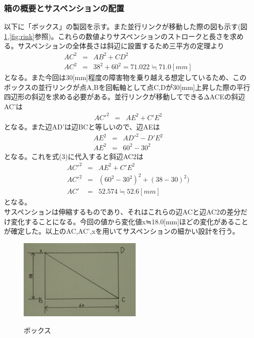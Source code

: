\documentclass[11pt]{jsarticle}
\begin{document}
\subsubsection{箱の概要とサスペンションの配置}
以下に「ボックス」の製図を示す。また並行リンクが移動した際の図も示す(図\ref{fig:bix},\ref{fig:rink}参照)。これらの数値よりサスペンションのストロークと長さを求める。サスペンションの全体長さは斜辺に設置するため三平方の定理より
\begin{eqnarray}
   AC^2 & = & AB^2+CD^2 \\
  AC^2 & = & 38^2+60^2 = 71.022 ≒　71.0 [mm]
\end{eqnarray}
となる。また今回は30[mm]程度の障害物を乗り越える想定しているため、このボックスの並行リンクが点A,Bを回転軸として点C,Dが30[mm]上昇した際の平行四辺形の斜辺を求める必要がある。並行リンクが移動してできるΔACEの斜辺AC'は
\begin{eqnarray}
   AC'^2 & = & AE^2+C'E^2 
\end{eqnarray}
となる。また辺AD'は辺BCと等しいので、辺AEは
\begin{eqnarray}
	AE^2 & = & AD'^2-D'E^2 \\
	AE^2 & = & 60^2-30^2 
\end{eqnarray}
となる。これを式(3)に代入すると斜辺AC2は
\begin{eqnarray}
	AC'^2 & = & AE^2+C'E^2 \\
	AC'^2 & = & (60^2-30^2)^2+(38-30)^2 ) \\
	AC' & = & 52.574 ≒　52.6[mm]
\end{eqnarray}
となる。　\\
サスペンションは伸縮するものであり、それはこれらの辺ACと辺AC2の差分だけ変化することになる。今回の値から変化値x≒18.0[mm]ほどの変化があることが確定した。以上のAC,AC',xを用いてサスペンションの細かい設計を行う。



\begin{figure}[htbt]
 \begin{center}
  \includegraphics[width=60mm]{kanizu.jpg}
 　\caption{ボックス}
  \label{fig:bix}%
 \end{center}
\end{figure}
\end{document}

